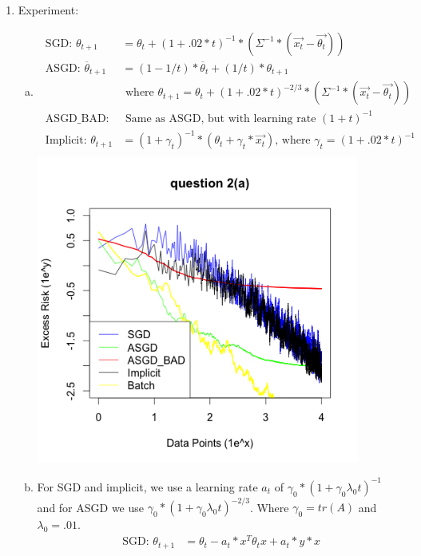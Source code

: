 \documentclass[paper=a4, fontsize=11pt]{scrartcl}
\begin{document}
\begin{enumerate}
\begin{enumerate}[(a)]
    \end{enumerate}
  \item Experiment: \\
    \begin{enumerate}[(a)]
      \item
        \begin{align*}
          \text{ SGD: } \theta_{t+1} &= \theta_t + (1 + .02*t)^{-1}*(\Sigma^{-1}*(\vec{x_t} - \vec{ \theta_t})) \\
          \text{ ASGD: } \overline{\theta}_{t+1} &= (1 - 1/t)*\overline{ \theta }_t + (1/t)*\theta_{t+1} \\
              & \text{ where } \theta_{t+1} = \theta_t + (1 + .02*t)^{-2/3}*(\Sigma^{-1}*(\vec{x_t} - \vec{ \theta_t})) \\
          \text{ ASGD\_BAD: } & \text{ Same as ASGD, but with learning rate } (1 + t)^{-1} \\
          \text{ Implicit: } \theta_{t+1} &= (1 + \gamma_t)^{-1}*(\theta_t + \gamma_t*\vec{x_t}) \text{, where } \gamma_t = (1 + .02*t)^{-1} \\
        \end{align*}
        \includegraphics[width=400px]{2a.png}
      \item For SGD and implicit, we use a learning rate $a_t$ of $\gamma_0 * (1 + \gamma_0 \lambda_0 t)^{-1}$ and for ASGD we use $\gamma_0 * (1 + \gamma_0 \lambda_0 t)^{-2/3}$. Where $\gamma_0 = tr(A)$ and $\lambda_0 = .01$. \\
        \begin{align*}
          \text{ SGD: } \theta_{t+1} &= \theta_t - a_t * x^T\theta_tx + a_t * y * x \\

\end{align*}
\end{enumerate}
\end{enumerate}
\end{document}
